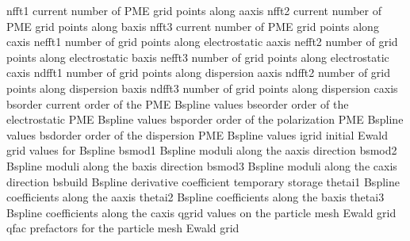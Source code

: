 \documentclass[letterpaper,11pt,english]{sphinxmanual}
\begin{document}
\begin{sphinxVerbatim}[commandchars=\\\{\}]
nfft1           current number of PME grid points along a\PYGZhy{}axis
nfft2           current number of PME grid points along b\PYGZhy{}axis
nfft3           current number of PME grid points along c\PYGZhy{}axis
nefft1          number of grid points along electrostatic a\PYGZhy{}axis
nefft2          number of grid points along electrostatic b\PYGZhy{}axis
nefft3          number of grid points along electrostatic c\PYGZhy{}axis
ndfft1          number of grid points along dispersion a\PYGZhy{}axis
ndfft2          number of grid points along dispersion b\PYGZhy{}axis
ndfft3          number of grid points along dispersion c\PYGZhy{}axis
bsorder         current order of the PME B\PYGZhy{}spline values
bseorder        order of the electrostatic PME B\PYGZhy{}spline values
bsporder        order of the polarization PME B\PYGZhy{}spline values
bsdorder        order of the dispersion PME B\PYGZhy{}spline values
igrid           initial Ewald grid values for B\PYGZhy{}spline
bsmod1          B\PYGZhy{}spline moduli along the a\PYGZhy{}axis direction
bsmod2          B\PYGZhy{}spline moduli along the b\PYGZhy{}axis direction
bsmod3          B\PYGZhy{}spline moduli along the c\PYGZhy{}axis direction
bsbuild         B\PYGZhy{}spline derivative coefficient temporary storage
thetai1         B\PYGZhy{}spline coefficients along the a\PYGZhy{}axis
thetai2         B\PYGZhy{}spline coefficients along the b\PYGZhy{}axis
thetai3         B\PYGZhy{}spline coefficients along the c\PYGZhy{}axis
qgrid           values on the particle mesh Ewald grid
qfac            prefactors for the particle mesh Ewald grid
\end{sphinxVerbatim}

\sphinxAtStartPar
{}
\end{document}
